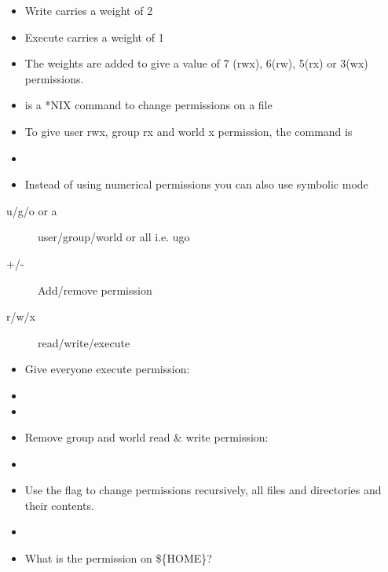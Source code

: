 \documentclass[10pt,t]{beamer}
\begin{document}
\begin{frame}
\begin{itemize}
    \item Write carries a weight of 2
    \item Execute carries a weight of 1
    \item The weights are added to give a value of 7 (rwx), 6(rw), 5(rx) or 3(wx) permissions. 
    \item {} is a *NIX command to change permissions on a file
    \item To give user rwx, group rx and world x permission, the command is
    \item[] 
    \item Instead of using numerical permissions you can also use symbolic mode
  \end{itemize}
  \begin{description}
    \item[u/g/o or a] user/group/world or all i.e. ugo
    \item[+/-] Add/remove permission
    \item[r/w/x] read/write/execute
  \end{description}
  \begin{itemize}
    \item Give everyone execute permission: 
    \item[] 
    \item[] 
    \item Remove group and world read \& write permission: 
    \item[] 
    \item Use the  flag to change permissions recursively, all files and directories and their contents.
    \item[] 
    \item[] What is the permission on \$\{HOME\}?
  \end{itemize}
\end{frame}
\end{document}
